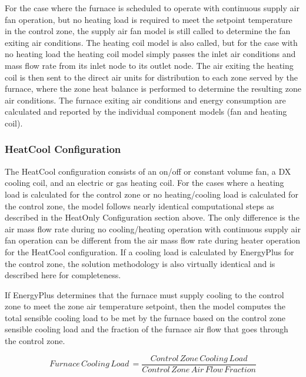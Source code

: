For the case where the furnace is scheduled to operate with continuous supply air fan operation, but no heating load is required to meet the setpoint temperature in the control zone, the supply air fan model is still called to determine the fan exiting air conditions. The heating coil model is also called, but for the case with no heating load the heating coil model simply passes the inlet air conditions and mass flow rate from its inlet node to its outlet node. The air exiting the heating coil is then sent to the direct air units for distribution to each zone served by the furnace, where the zone heat balance is performed to determine the resulting zone air conditions. The furnace exiting air conditions and energy consumption are calculated and reported by the individual component models (fan and heating coil).

\subsubsection{HeatCool Configuration}\label{heatcool-configuration}

The HeatCool configuration consists of an on/off or constant volume fan, a DX cooling coil, and an electric or gas heating coil. For the cases where a heating load is calculated for the control zone or no heating/cooling load is calculated for the control zone, the model follows nearly identical computational steps as described in the HeatOnly Configuration section above. The only difference is the air mass flow rate during no cooling/heating operation with continuous supply air fan operation can be different from the air mass flow rate during heater operation for the HeatCool configuration. If a cooling load is calculated by EnergyPlus for the control zone, the solution methodology is also virtually identical and is described here for completeness.

If EnergyPlus determines that the furnace must supply cooling to the control zone to meet the zone air temperature setpoint, then the model computes the total sensible cooling load to be met by the furnace based on the control zone sensible cooling load and the fraction of the furnace air flow that goes through the control zone.

\begin{equation}
Furnace\,Cooling\,Load\, = \frac{{Control\,Zone\,Cooling\,Load}}{{Control\,Zone\,Air\,Flow\,Fraction}}
\end{equation}

